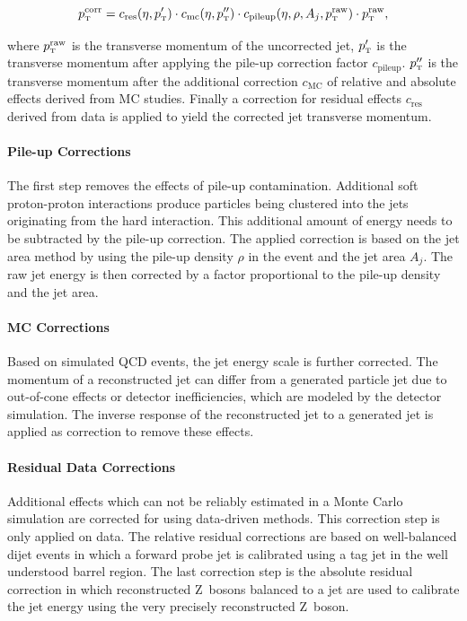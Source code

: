 \begin{equation*}
    \pt^{\mathrm{corr}} = c_{\mathrm{res}} (\eta, \pt^{\prime}) \cdot c_{\mathrm{mc}}
    (\eta, \pt^{\prime\prime}) \cdot c_{\mathrm{pileup}}(\eta, \rho, A_j,
    \pt^{\mathrm{raw}}) \cdot \pt^{\mathrm{raw}},
\end{equation*}


where $\pt^{\mathrm{raw}}$ is the transverse momentum of the uncorrected jet,
$\pt^{\prime}$ is the transverse momentum after applying the pile-up correction
factor $c_{\mathrm{pileup}}$. $\pt^{\prime\prime}$ is the transverse momentum
after the additional correction $c_\mathrm{MC}$ of relative and absolute effects
derived from MC studies. Finally a correction for residual effects
$c_{\mathrm{res}}$ derived from data is applied to yield the corrected jet
transverse momentum.

\paragraph{Pile-up Corrections}
\label{pileup_correction}

The first step removes the effects of pile-up contamination. Additional soft
proton-proton interactions produce particles being clustered into the jets
originating from the hard interaction. This additional amount of energy needs to
be subtracted by the pile-up correction. The applied correction is based on the
jet area method by using the pile-up density $\rho$ in the event and the jet
area $A_j$. The raw jet energy is then corrected by a factor proportional to the
pile-up density and the jet area.

\paragraph{MC Corrections}

Based on simulated QCD events, the jet energy scale is further corrected. The
momentum of a reconstructed jet can differ from a generated particle jet due to
out-of-cone effects or detector inefficiencies, which are modeled by the detector
simulation. The inverse response of the reconstructed jet to a generated jet is
applied as correction to remove these effects.

\paragraph{Residual Data Corrections}

Additional effects which can not be reliably estimated in a Monte Carlo
simulation are corrected for using data-driven methods. This correction step is
only applied on data. The relative residual corrections are based on
well-balanced dijet events in which a forward probe jet is calibrated using a
tag jet in the well understood barrel region. The last correction step is the
absolute residual correction in which reconstructed Z~bosons balanced to a jet
are used to calibrate the jet energy using the very precisely reconstructed Z~boson.
